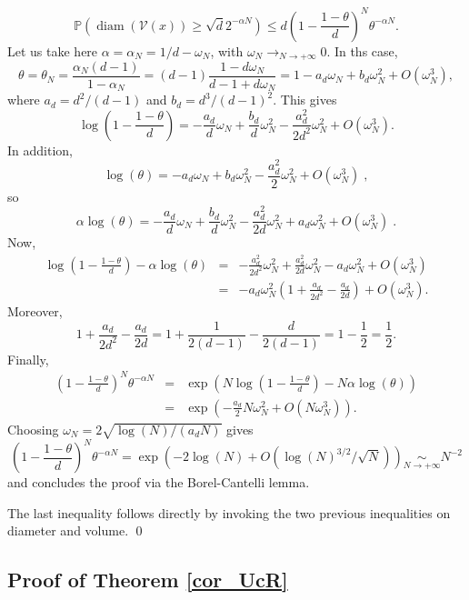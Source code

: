 \documentclass[paper=a4, fontsize=11pt]{scrartcl}
\newcommand{\diam}{\operatorname{diam}}
\newcommand{\PP}{\mathbb{P}}
\begin{document}
\[
 \PP(\diam(\mathcal{V}(x))\geq \sqrt{d}2^{-\alpha N}) \leq d\left(1-\frac{1-\theta}{d}\right)^N \theta^{-\alpha N}.
\]
Let us take here $\alpha=\alpha_N=1/d-\omega_N$, with $\omega_N \rightarrow_{N\rightarrow +\infty} 0$. In ths case,
\[
\theta=\theta_N=\frac{\alpha_N(d-1)}{1-\alpha_N}=(d-1)\frac{1-d\omega_N}{d-1+d\omega_N}=1-a_d \omega_N+ b_d \omega_N^2+O(\omega_N^3),
\]
where $a_d=d^2/(d-1)$ and $b_d=d^3/(d-1)^2$. This gives
\[
\log\left(1-\frac{1-\theta}{d}\right)= - \frac{a_d}{d} \omega_N+ \frac{b_d}{d}\omega_N^2 - \frac{a^2_d}{2d^2}\omega_N^2 + O(\omega_N^3).
\]
In addition, $$\log(\theta) = - a_d \omega_N + b_d \omega_N^2 -  \frac{a_d^2}{2} \omega_N^2 + O(\omega_N^3)\;,$$
so $$\alpha \log(\theta) = - \frac{a_d}{d} \omega_N + \frac{b_d}{d} \omega_N^2 -  \frac{a_d^2}{2d} \omega_N^2 + a_d \omega_N^2 + O(\omega_N^3)\;.$$
Now,
\begin{eqnarray*}
    \log\left(1-\frac{1-\theta}{d}\right) - \alpha \log(\theta) &=& -\frac{a^2_d}{2d^2}\omega_N^2 + \frac{a_d^2}{2d} \omega_N^2 - a_d \omega_N^2 + O(\omega_N^3) \\ &=& - a_d \omega_N^2 \left( 1 + \frac{a_d}{2d^2} - \frac{a_d}{2d} \right) + O(\omega_N^3).
\end{eqnarray*}
Moreover,
$$1 + \frac{a_d}{2d^2} - \frac{a_d}{2d}  = 1 + \frac{1}{2(d-1)} - \frac{d}{2(d-1)} = 1 - \frac{1}{2} = \frac{1}{2}.$$
Finally,
\begin{eqnarray*}
  \left(1-\frac{1-\theta}{d}\right)^N \theta^{-\alpha N} &=& \exp \left( N \log\left(1-\frac{1-\theta}{d}\right) - N \alpha \log(\theta)    \right) \\ &=& \exp \left( - \frac{a_d}{2} N \omega_N^2 + O(N \omega_N^3)  \right).  
\end{eqnarray*}
Choosing $\omega_N=2 \sqrt{\log(N)/(a_d N)}$ gives
$$\left(1-\frac{1-\theta}{d}\right)^N \theta^{-\alpha N} = \exp \left( - 2 \log(N) + O \left(\log(N)^{3/2} / \sqrt{N}   \right) \right) \underset{ {N \to + \infty}}\sim N^{-2}$$
and concludes the proof via the Borel-Cantelli lemma.

The last inequality follows directly by invoking the two previous inequalities on diameter and volume.
\qed

\subsection*{Proof of Theorem \ref{cor_UcR}}
\end{document}
